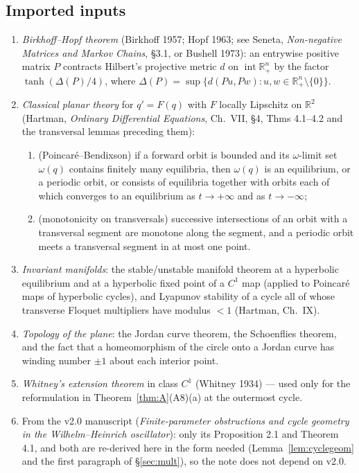 \documentclass[11pt,a4paper]{article}
\numberwithin{equation}{section}
\theoremstyle{remark}\newtheorem{remark}[theorem]{Remark}
\newcommand{\R}{\mathbb R}
\DeclareMathOperator{\inter}{int}
\begin{document}
\subsection{Imported inputs}\label{sec:inputs}
\begin{enumerate}[label=(I\arabic*)]
\item \emph{Birkhoff--Hopf theorem} (Birkhoff 1957; Hopf 1963; see Seneta, \emph{Non-negative Matrices and Markov
Chains}, \S3.1, or Bushell 1973): an entrywise positive matrix $P$ contracts Hilbert's projective metric $d$ on
$\inter\R^n_+$ by the factor $\tanh(\Delta(P)/4)$, where $\Delta(P)=\sup\{d(Pu,Pw):u,w\in\R^n_+\setminus\{0\}\}$.
\item \emph{Classical planar theory} for $q'=F(q)$ with $F$ locally Lipschitz on $\R^2$ (Hartman, \emph{Ordinary
Differential Equations}, Ch.~VII, \S4, Thms 4.1--4.2 and the transversal lemmas preceding them):
\begin{enumerate}[label=(\alph*)]
\item (Poincar\'e--Bendixson) if a forward orbit is bounded and its $\omega$-limit set $\omega(q)$ contains finitely
many equilibria, then $\omega(q)$ is an equilibrium, or a periodic orbit, or consists of equilibria together with
orbits each of which converges to an equilibrium as $t\to+\infty$ and as $t\to-\infty$;
\item (monotonicity on transversals) successive intersections of an orbit with a transversal segment are monotone
along the segment, and a periodic orbit meets a transversal segment in at most one point.
\end{enumerate}
\item \emph{Invariant manifolds}: the stable/unstable manifold theorem at a hyperbolic equilibrium and at a
hyperbolic fixed point of a $C^1$ map (applied to Poincar\'e maps of hyperbolic cycles), and Lyapunov stability of
a cycle all of whose transverse Floquet multipliers have modulus $<1$ (Hartman, Ch.~IX).
\item \emph{Topology of the plane}: the Jordan curve theorem, the Schoenflies theorem, and the fact that a
homeomorphism of the circle onto a Jordan curve has winding number $\pm1$ about each interior point.
\item \emph{Whitney's extension theorem} in class $C^1$ (Whitney 1934) --- used only for the reformulation in
Theorem~\ref{thm:A}(A8)(a) at the outermost cycle.
\item From the v2.0 manuscript (\emph{Finite-parameter obstructions and cycle geometry in the Wilhelm--Heinrich
oscillator}): only its Proposition 2.1 and Theorem 4.1, and both are re-derived here in the form needed
(Lemma~\ref{lem:cyclegeom} and the first paragraph of \S\ref{sec:mult}), so the note does not depend on v2.0.
\end{enumerate}
\end{document}

